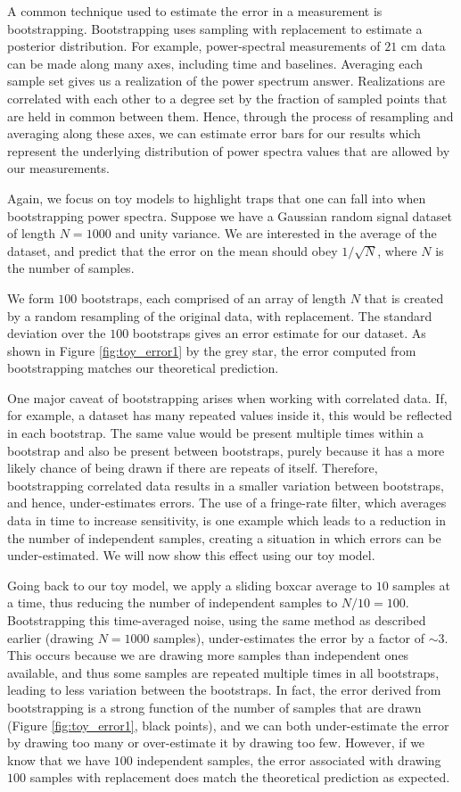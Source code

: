 \documentclass[preprint2,numberedappendix,tighten]{aastex6}  %
\begin{document}
A common technique used to estimate the error in a measurement is bootstrapping. Bootstrapping uses sampling with replacement to estimate a posterior distribution. For example, power-spectral measurements of $21$ cm data can be made along many axes, including time and baselines. Averaging each sample set gives us a realization of the power spectrum answer. Realizations are correlated with each other to a degree set by the fraction of sampled points that are held in common between them. Hence, through the process of resampling and averaging along these axes, we can estimate error bars for our results which represent the underlying distribution of power spectra values that are allowed by our measurements.

Again, we focus on toy models to highlight traps that one can fall into when bootstrapping power spectra. Suppose we have a Gaussian random signal dataset of length $N=1000$ and unity variance. We are interested in the average of the dataset, and predict that the error on the mean should obey $1/\sqrt{N}$, where $N$ is the number of samples.

We form $100$ bootstraps, each comprised of an array of length $N$ that is created by a random resampling of the original data, with replacement. The standard deviation over the $100$ bootstraps gives an error estimate for our dataset. As shown in Figure \ref{fig:toy_error1} by the grey star, the error computed from bootstrapping matches our theoretical prediction.

One major caveat of bootstrapping arises when working with correlated data. If, for example, a dataset has many repeated values inside it, this would be reflected in each bootstrap. The same value would be present multiple times within a bootstrap and also be present between bootstraps, purely because it has a more likely chance of being drawn if there are repeats of itself. Therefore, bootstrapping correlated data results in a smaller variation between bootstraps, and hence, under-estimates errors. The use of a fringe-rate filter, which averages data in time to increase sensitivity, is one example which leads to a reduction in the number of independent samples, creating a situation in which errors can be under-estimated. We will now show this effect using our toy model.

Going back to our toy model, we apply a sliding boxcar average to $10$ samples at a time, thus reducing the number of independent samples to $N/10 = 100$. Bootstrapping this time-averaged noise, using the same method as described earlier (drawing $N=1000$ samples), under-estimates the error by a factor of $\sim3$. This occurs because we are drawing more samples than independent ones available, and thus some samples are repeated multiple times in all bootstraps, leading to less variation between the bootstraps. In fact, the error derived from bootstrapping is a strong function of the number of samples that are drawn (Figure \ref{fig:toy_error1}, black points), and we can both under-estimate the error by drawing too many or over-estimate it by drawing too few. However, if we know that we have $100$ independent samples, the error associated with drawing $100$ samples with replacement does match the theoretical prediction as expected.
\end{document}
